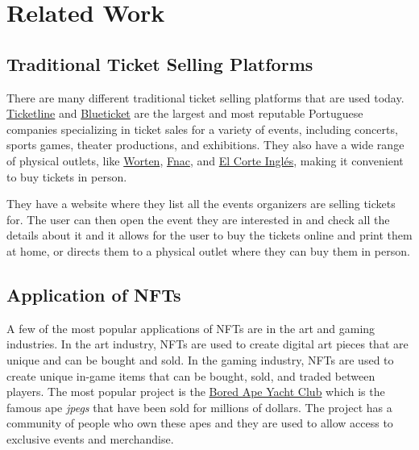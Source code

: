 \section{Related Work}
\label{sec:related_work}

\subsection{Traditional Ticket Selling Platforms}
\label{subsec:traditional_ticket_selling_platforms}

There are many different traditional ticket selling platforms that are used today. \href{https://ticketline.sapo.pt/}{Ticketline} and \href{https://blueticket.meo.pt/}{Blueticket} are the largest and most reputable Portuguese companies specializing in ticket sales for a variety of events, including concerts, sports games, theater productions, and exhibitions. They also have a wide range of physical outlets, like \href{https://www.worten.pt/}{Worten}, \href{https://www.fnac.pt/}{Fnac}, and \href{https://www.elcorteingles.pt/}{El Corte Inglés}, making it convenient to buy tickets in person.

They have a website where they list all the events organizers are selling tickets for. The user can then open the event they are interested in and check all the details about it and it allows for the user to buy the tickets online and print them at home, or directs them to a physical outlet where they can buy them in person.



\subsection{Application of NFTs}
\label{subsec:application_of_nfts}

A few of the most popular applications of NFTs are in the art and gaming industries. In the art industry, NFTs are used to create digital art pieces that are unique and can be bought and sold. In the gaming industry, NFTs are used to create unique in-game items that can be bought, sold, and traded between players.
The most popular project is the \href{https://www.boredapeyachtclub.com/}{Bored Ape Yacht Club} which is the famous ape \textit{jpegs} that have been sold for millions of dollars. The project has a community of people who own these apes and they are used to allow access to exclusive events and merchandise.